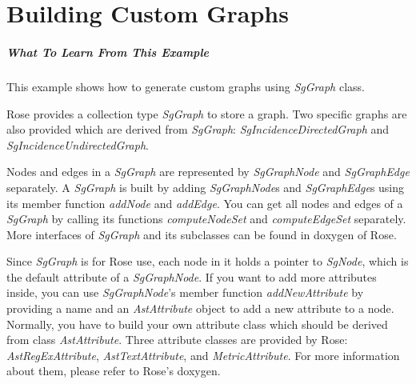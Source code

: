 \chapter{Building Custom Graphs}
\label{Tutorial:chapterCustomGraphs}

\paragraph{What To Learn From This Example}
This example shows how to generate custom graphs using \textit{SgGraph} class.

Rose provides a collection type \textit{SgGraph} to store a graph. Two specific graphs
are also provided which are derived from \textit{SgGraph}: \textit{SgIncidenceDirectedGraph} and
\textit{SgIncidenceUndirectedGraph}.

Nodes and edges in a \textit{SgGraph} are represented by \textit{SgGraphNode} and \textit{SgGraphEdge} separately. 
A \textit{SgGraph} is built by adding \textit{SgGraphNode}s and \textit{SgGraphEdge}s using its member function
\textit{addNode} and \textit{addEdge}. You can get all nodes and edges of a \textit{SgGraph} by calling its functions
\textit{computeNodeSet} and \textit{computeEdgeSet} separately.
More interfaces of \textit{SgGraph} and its subclasses can be found in doxygen of Rose.

Since \textit{SgGraph} is for Rose use, each node in it holds a pointer to \textit{SgNode}, which is 
the default attribute of a \textit{SgGraphNode}. If you want to add more attributes inside, you
can use \textit{SgGraphNode}'s member function \textit{addNewAttribute} by providing a name and an \textit{AstAttribute}
object to add a new attribute to a node. Normally, you have to build your own 
attribute class which should be derived from class \textit{AstAttribute}. Three attribute
classes are provided by Rose: \textit{AstRegExAttribute}, \textit{AstTextAttribute}, and \textit{MetricAttribute}. 
For more information about them, please refer to Rose's doxygen. 


